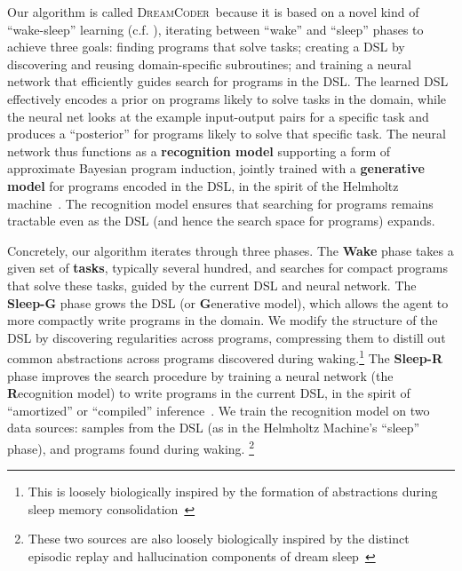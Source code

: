 \documentclass{article}
\newcommand{\system}{\textsc{DreamCoder}~}
\begin{document}
Our algorithm is called \system because it is based on a
novel kind of ``wake-sleep'' learning (c.f. \cite{hinton1995wake}), iterating
between ``wake'' and ``sleep'' phases to achieve three goals: finding
programs that solve tasks; creating a DSL by discovering
and reusing domain-specific subroutines; and training a neural network
that efficiently guides search for programs in the DSL.
The learned DSL effectively encodes a prior on programs likely to
solve tasks in the domain, while the neural net looks at the example
input-output pairs for a specific task and produces a ``posterior''
for programs likely to solve that specific task.  The neural network
thus functions as a \textbf{recognition model} supporting a form of
approximate Bayesian program induction, jointly trained with a
\textbf{generative model} for programs encoded in the DSL, in the
spirit of the Helmholtz machine~\cite{hinton1995wake}. The
recognition model ensures that searching for programs remains
tractable even as the DSL (and hence the search space for programs)
expands.


Concretely, our algorithm iterates through three phases. 
The \textbf{Wake} phase takes a given set of \textbf{tasks}, typically
several hundred, and searches for compact programs that solve these tasks,
guided by the current DSL and neural network.
The \textbf{Sleep-G} phase grows the DSL (or \textbf{G}enerative model),
which allows the agent to more compactly
write programs in the domain. We modify the structure of the DSL by
discovering regularities across programs, compressing
them to distill out common abstractions across  programs discovered during waking.\footnote{This is loosely biologically
    inspired by the formation of abstractions during sleep memory
    consolidation~\cite{DUDAI201520}}
The \textbf{Sleep-R} phase improves the search procedure by training a neural network (the \textbf{R}ecognition model) to
write programs in the current DSL, in the spirit of ``amortized'' or
``compiled'' inference~\cite{le2016inference}.
We train the recognition model on  two data sources: samples
from the DSL (as in the Helmholtz Machine's ``sleep'' phase), and
programs found during waking.%
\footnote{These two sources are also
    loosely biologically inspired by the distinct episodic replay and
    hallucination components of dream sleep~\cite{fosse2003dreaming}}
    
\end{document}
